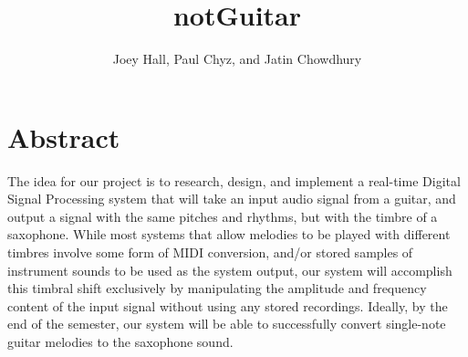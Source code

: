 \documentclass{article}
\title{notGuitar}
\author{Joey Hall, Paul Chyz, and Jatin Chowdhury}
\begin{document}
\maketitle

\section{Abstract}
The idea for our project is to research, design, and implement a real-time Digital Signal Processing system that will take an input audio signal from a guitar, and output a signal with the same pitches and rhythms, but with the timbre of a saxophone. While most systems that allow melodies to be played with different timbres involve some form of MIDI conversion, and/or stored samples of instrument sounds to be used as the system output, our system will accomplish this timbral shift exclusively by manipulating the amplitude and frequency content of the input signal without using any stored recordings. Ideally, by the end of the semester, our system will be able to successfully convert single-note guitar melodies to the saxophone sound.
\end{document}
